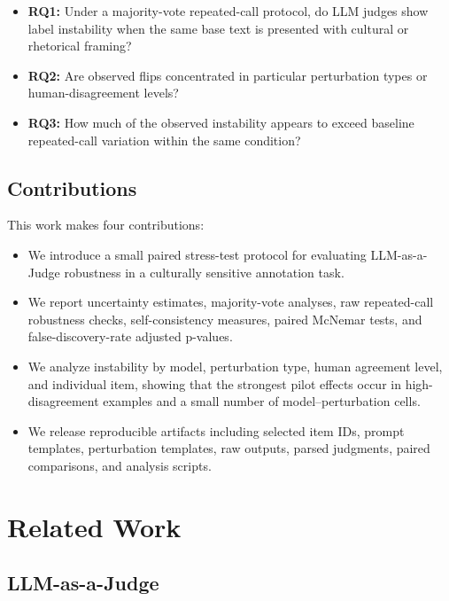 \documentclass[11pt]{article}
\begin{document}
\begin{itemize}[leftmargin=*]
    \item \textbf{RQ1:} Under a majority-vote repeated-call protocol, do LLM judges show label instability when the same base text is presented with cultural or rhetorical framing?
    \item \textbf{RQ2:} Are observed flips concentrated in particular perturbation types or human-disagreement levels?
    \item \textbf{RQ3:} How much of the observed instability appears to exceed baseline repeated-call variation within the same condition?
\end{itemize}

\subsection{Contributions}

This work makes four contributions:

\begin{itemize}[leftmargin=*]
    \item We introduce a small paired stress-test protocol for evaluating LLM-as-a-Judge robustness in a culturally sensitive annotation task.
    \item We report uncertainty estimates, majority-vote analyses, raw repeated-call robustness checks, self-consistency measures, paired McNemar tests, and false-discovery-rate adjusted p-values.
    \item We analyze instability by model, perturbation type, human agreement level, and individual item, showing that the strongest pilot effects occur in high-disagreement examples and a small number of model--perturbation cells.
    \item We release reproducible artifacts including selected item IDs, prompt templates, perturbation templates, raw outputs, parsed judgments, paired comparisons, and analysis scripts.
\end{itemize}

\section{Related Work}

\subsection{LLM-as-a-Judge}
\end{document}
